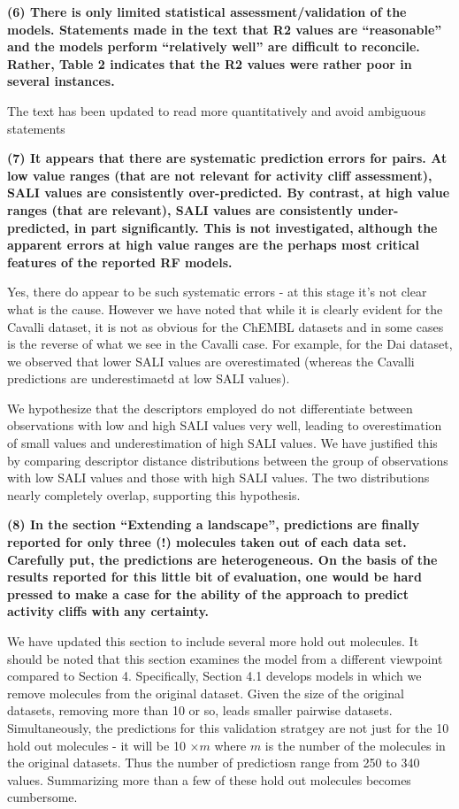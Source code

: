 \documentclass[letterpaper, 12pt]{article}
\begin{document}
\textbf{(6) There is only limited statistical assessment/validation of the models. Statements made in the
text that R2 values are “reasonable” and the models perform “relatively well” are difficult to
reconcile. Rather, Table 2 indicates that the R2 values were rather poor in several instances.}

The text has been updated to read more quantitatively and avoid ambiguous statements

\textbf{(7) It appears that there are systematic prediction errors for pairs. At low value ranges (that are
not relevant for activity cliff assessment), SALI values are consistently over-predicted. By
contrast, at high value ranges (that are relevant), SALI values are consistently under-predicted, in
part significantly. This is not investigated, although the apparent errors at high value ranges are
the perhaps most critical features of the reported RF models.}

Yes, there do appear to be such systematic errors - at this stage it's not clear what is the
cause. However we have noted that while it is clearly evident for the Cavalli dataset, it is not
as obvious for the ChEMBL datasets and in some cases is the reverse of what we see in the Cavalli
case. For example, for the Dai dataset, we observed that lower SALI values are overestimated
(whereas the Cavalli predictions are underestimaetd at low SALI values).

We hypothesize that the descriptors employed do not differentiate between observations with low and
high SALI values very well, leading to overestimation of small values and underestimation of high
SALI values. We have justified this by comparing descriptor distance distributions between the
group of observations with low SALI values and those with high SALI values. The two distributions
nearly completely overlap, supporting this hypothesis.

\textbf{(8) In the section “Extending a landscape”, predictions are finally reported for only three (!)
molecules taken out of each data set. Carefully put, the predictions are heterogeneous. On the basis
of the results reported for this little bit of evaluation, one would be hard pressed to make a case
for the ability of the approach to predict activity cliffs with any certainty.}

We have updated this section to include several more hold out molecules. It should be noted that this section
examines the model from a different viewpoint compared to Section 4. Specifically, Section 4.1
develops models in which we remove molecules from the original dataset. Given the size of the
original datasets, removing more than 10 or so, leads smaller pairwise datasets. Simultaneously, the
predictions for this validation stratgey are not just for the 10 hold out molecules - it will be 10
$\times m$ where $m$ is the number of the molecules in the original datasets. Thus the number of
predictiosn range from 250 to 340 values. Summarizing more than a few of these hold out molecules
becomes cumbersome.
\end{document}
